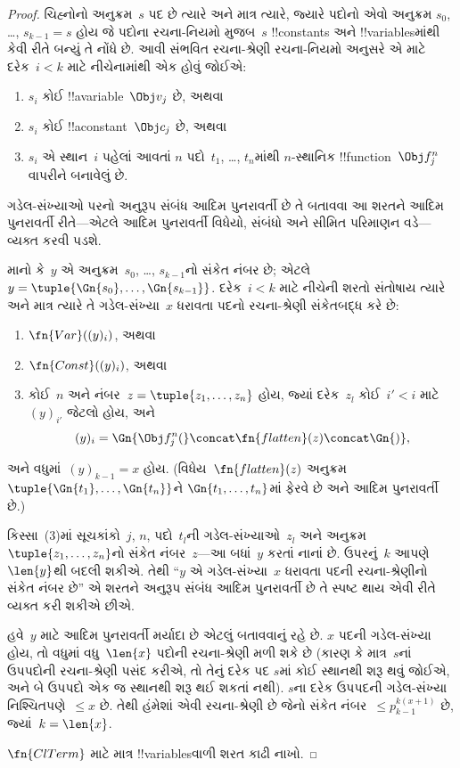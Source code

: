\documentclass[../../../include/open-logic-section]{subfiles}
\begin{document}
\begin{proof}
ચિહ્નોનો અનુક્રમ~$s$ પદ છે ત્યારે અને
માત્ર ત્યારે, જ્યારે પદોનો એવો અનુક્રમ
$s_0$, \dots, $s_{k-1} = s$ હોય જે
પદોના રચના-નિયમો મુજબ~$s$ !!{constant}s અને
!!{variable}sમાંથી કેવી રીતે બન્યું તે નોંધે છે.
આવી સંભવિત રચના-શ્રેણી રચના-નિયમો
અનુસરે એ માટે દરેક~$i < k$ માટે
નીચેનામાંથી એક હોવું જોઈએ:
\begin{enumerate}
\item $s_i$ કોઈ !!a{variable}~$\Obj v_j$ છે, અથવા
\item $s_i$ કોઈ !!a{constant}~$\Obj c_j$ છે, અથવા
\item $s_i$ એ સ્થાન~$i$ પહેલાં આવતાં
  $n$ પદો~$t_1$, \dots, $t_n$માંથી
  $n$-સ્થાનિક !!{function}~$\Obj f^n_j$
  વાપરીને બનાવેલું છે.
\end{enumerate}
ગડેલ-સંખ્યાઓ પરનો અનુરૂપ સંબંધ આદિમ
પુનરાવર્તી છે તે બતાવવા આ શરતને
આદિમ પુનરાવર્તી રીતે—એટલે આદિમ
પુનરાવર્તી વિધેયો, સંબંધો અને સીમિત
પરિમાણન વડે—વ્યક્ત કરવી પડશે.

માનો કે~$y$ એ અનુક્રમ~$s_0$, \dots,
$s_{k-1}$નો સંકેત નંબર છે; એટલે
$y = \tuple{\Gn{s_0}, \dots, \Gn{s_{k-1}}}$.
દરેક~$i < k$ માટે નીચેની શરતો
સંતોષાય ત્યારે અને માત્ર ત્યારે તે
ગડેલ-સંખ્યા~$x$ ધરાવતા પદનો
રચના-શ્રેણી સંકેતબદ્ધ કરે છે:
\begin{enumerate}
\item $\fn{Var}((y)_i)$, અથવા
\item $\fn{Const}((y)_i)$, અથવા
\item કોઈ~$n$ અને
  નંબર~$z = \tuple{z_1, \dots, z_n}$
  હોય, જ્યાં દરેક~$z_l$ કોઈ~$i' < i$
  માટે~$(y)_{i'}$ જેટલો હોય, અને
\[
(y)_i = \Gn{\Obj f^n_j(} \concat \fn{flatten}(z) \concat \Gn{)},
\]
\end{enumerate}
અને વધુમાં~$(y)_{k-1} = x$ હોય.
(વિધેય~$\fn{flatten}(z)$ અનુક્રમ
$\tuple{\Gn{t_1}, \dots, \Gn{t_n}}$ને
$\Gn{t_1, \dots,
  t_n}$માં ફેરવે છે અને આદિમ પુનરાવર્તી છે.)

કિસ્સા~(3)માં સૂચકાંકો~$j$, $n$, પદો~$t_l$ની
ગડેલ-સંખ્યાઓ~$z_l$ અને
અનુક્રમ~$\tuple{z_1, \dots, z_n}$નો
સંકેત નંબર~$z$—આ બધાં~$y$ કરતાં
નાનાં છે. ઉપરનું~$k$ આપણે~$\len{y}$થી
બદલી શકીએ. તેથી ``$y$ એ ગડેલ-સંખ્યા~$x$
ધરાવતા પદની રચના-શ્રેણીનો સંકેત
નંબર છે'' એ શરતને અનુરૂપ સંબંધ
આદિમ પુનરાવર્તી છે તે સ્પષ્ટ થાય
એવી રીતે વ્યક્ત કરી શકીએ છીએ.

હવે~$y$ માટે આદિમ પુનરાવર્તી મર્યાદા
છે એટલું બતાવવાનું રહે છે. $x$ પદની
ગડેલ-સંખ્યા હોય, તો વધુમાં વધુ~$\len{x}$
પદોની રચના-શ્રેણી મળી શકે છે
(કારણ કે માત્ર~$s$નાં ઉપપદોની રચના-શ્રેણી
પસંદ કરીએ, તો તેનું દરેક પદ
$s$માં કોઈ સ્થાનથી શરૂ થવું જોઈએ,
અને બે ઉપપદો એક જ સ્થાનથી શરૂ
થઈ શકતાં નથી). $s$ના દરેક ઉપપદની
ગડેલ-સંખ્યા નિશ્ચિતપણે~$\le x$ છે.
તેથી હંમેશાં એવી રચના-શ્રેણી છે જેનો
સંકેત નંબર~$\le p_{k-1}^{k(x+1)}$ છે,
જ્યાં~$k=\len{x}$.

$\fn{ClTerm}$ માટે માત્ર
!!{variable}sવાળી શરત કાઢી નાખો.
\end{proof}
\end{document}

